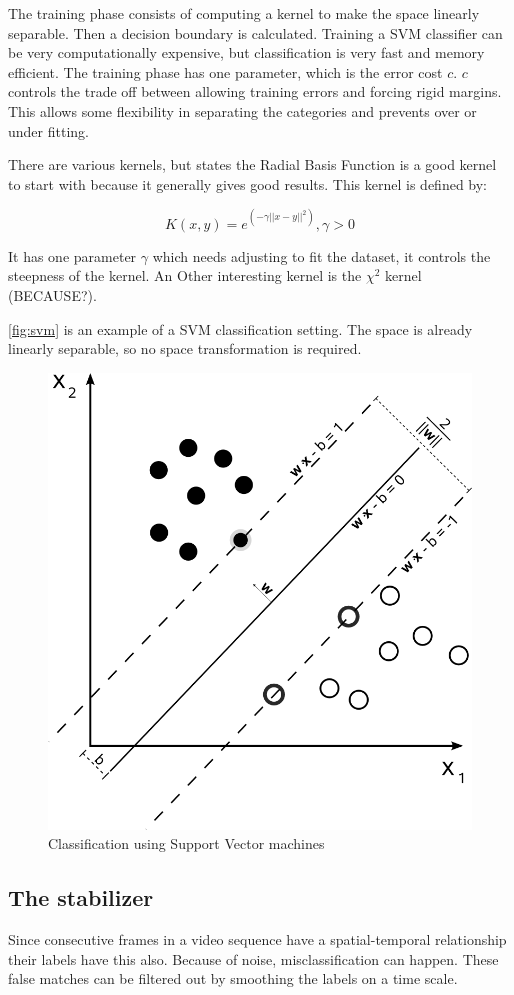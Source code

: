 The training phase consists of computing a kernel to make the space linearly separable. Then a decision boundary is calculated. Training a SVM classifier can be very computationally expensive, but classification is very fast and memory efficient. The training phase has one parameter, which is the error cost $c$. $c$ controls the trade off between allowing training errors and forcing rigid margins. This allows some flexibility in separating the categories and prevents over or under fitting.

There are various kernels, but \cite{Hsu2003} states the Radial Basis Function is a good kernel to start with because it generally gives good results. This kernel is defined by:

\begin{equation}
	K(x,y) = e^{(-\gamma||x-y||^2)}, \gamma > 0
\end{equation}

It has one parameter $\gamma$ which needs adjusting to fit the dataset, it controls the steepness of the kernel. An Other interesting kernel is the $\chi^2$ kernel (BECAUSE?).

\autoref{fig:svm} is an example of a SVM classification setting. The space is already linearly separable, so no space transformation is required. 

\begin{figure}[htbp]
\center{}
\includegraphics[width=0.3\linewidth]{figures/svm.png}
\caption{Classification using Support Vector machines}
\label{fig:svm}
\end{figure}




\subsection*{The stabilizer}
\label{subsec:stabilizer}
Since consecutive frames in a video sequence have a spatial-temporal relationship their labels have this also. Because of noise, misclassification can happen. These false matches can be filtered out by smoothing the labels on a time scale.

